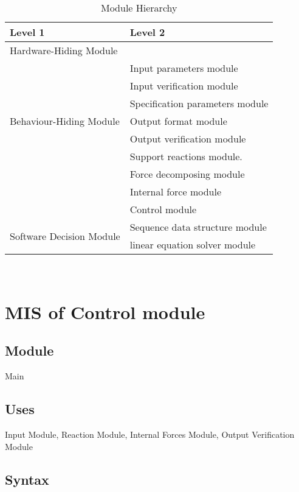 \documentclass[12pt, titlepage]{article}
\begin{document}
\begin{table}[h!]
\centering
\begin{tabular}{p{} p{}}
\toprule
\textbf{Level 1} & \textbf{Level 2}\\
\midrule

{Hardware-Hiding Module} & ~ \\
\midrule

\multirow{7}{0.3\textwidth}{Behaviour-Hiding Module} & Input parameters module\\
& Input verification module\\
& Specification parameters module\\
& Output format module\\
& Output verification module\\
& Support reactions module. \\
& Force decomposing module\\
& Internal force module\\
& Control module\\ 

\midrule

\multirow{3}{0.3\textwidth}{Software Decision Module} & Sequence data structure module\\
& linear equation solver module\\
\bottomrule

\end{tabular}
\caption{Module Hierarchy}
\label{TblMH}
\end{table}
\newpage
~\newpage

\section{MIS of Control module \label{mControl} }

\subsection{Module}

Main

\subsection{Uses}
Input Module, Reaction Module, Internal Forces Module, Output Verification Module

\subsection{Syntax}
\end{document}
